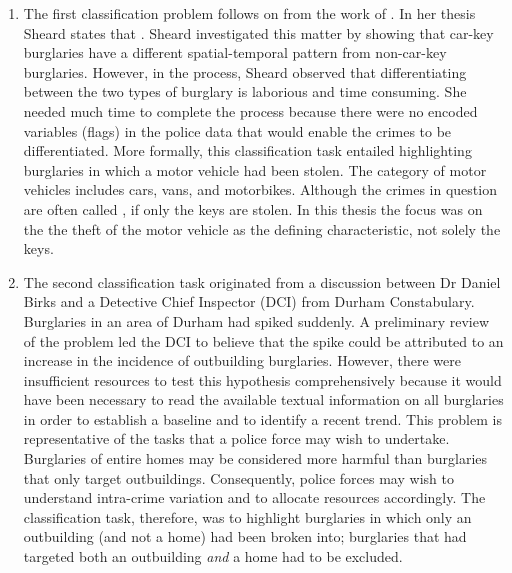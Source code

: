 \begin{enumerate}
   
\item The first classification problem follows on from the work of \parencite{sheard2020developing}. In her thesis Sheard states that . Sheard investigated this matter by showing that car-key burglaries have a different spatial-temporal pattern from non-car-key burglaries. However, in the process, Sheard observed that differentiating between the two types of burglary is laborious and time consuming. She needed much time to complete the process because there were no encoded variables (flags) in the police data that would enable the crimes to be differentiated. More formally, this classification task entailed highlighting burglaries in which a motor vehicle had been stolen. The category of motor vehicles includes cars, vans, and motorbikes. Although the crimes in question are often called , if only the keys are stolen. In this thesis the focus was on the the theft of the motor vehicle as the defining characteristic, not solely the keys.

 \item The second classification task originated from a discussion between Dr Daniel Birks and a Detective Chief Inspector (DCI) from Durham Constabulary. Burglaries in an area of Durham had spiked suddenly. A preliminary review of the problem led the DCI to believe that the spike could be attributed to an increase in the incidence of outbuilding burglaries. However, there were insufficient resources to test this hypothesis comprehensively because it would have been necessary to read the available textual information on all burglaries in order to establish a baseline and to identify a recent trend. This problem is representative of the tasks that a police force may wish to undertake. Burglaries of entire homes may be considered more harmful than burglaries that only target outbuildings. Consequently, police forces may wish to understand intra-crime variation and to allocate resources accordingly. The classification task, therefore, was to highlight burglaries in which only an outbuilding (and not a home) had been broken into; burglaries that had targeted both an outbuilding \emph{and} a home had to be excluded.



\end{enumerate}
